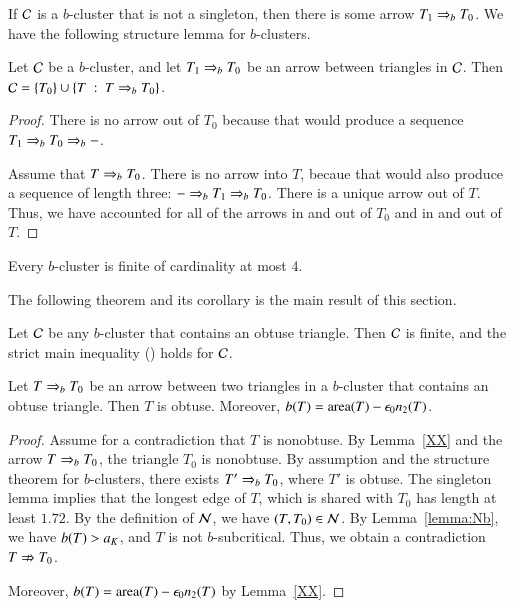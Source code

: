 If $\mathcal C$ is a $b$-cluster that is not a singleton, then there is
some arrow $T_1\Rightarrow_{b} T_0$.  We have the following structure
lemma for $b$-clusters.

\begin{lemma}
  Let $\mathcal C$ be a $b$-cluster, and let $T_1\Rightarrow_{b} T_0$ be an
  arrow between triangles in $\mathcal C$.
  Then $\mathcal C = \{T_0\}\cup \{T \ :\  T\Rightarrow_{b} T_0\}$.
\end{lemma}

\begin{proof}  There is no arrow out of $T_0$ because that
would produce a sequence $T_1\Rightarrow_{b} T_0\Rightarrow_{b} -$.  

Assume that $T\Rightarrow_{b} T_0$.  There is
no arrow into $T$,  becaue that would also produce a sequence
of length three: $- \Rightarrow_{b} T_1 \Rightarrow_{b} T_0$.  There is a unique arrow out of $T$.
Thus, we have accounted for all of the arrows in and out of $T_0$ and in and
out of $T$.
\end{proof}

\begin{corollary}
  Every $b$-cluster is finite of cardinality at most $4$.
\end{corollary}


The following theorem and its corollary is the main result of this
section.  

\begin{theorem}  
  Let $\mathcal C$ be any $b$-cluster that contains an obtuse triangle.  Then
  $\mathcal C$ is finite, and the strict main inequality
  () holds for $\mathcal C$.
\end{theorem}

\begin{lemma} Let $T\Rightarrow_{b} T_0$ be an arrow between two triangles in
a $b$-cluster that contains an obtuse triangle.  Then $T$ is obtuse.
Moreover, $b(T) = {\operatorname{area}}(T) -\epsilon_0 n_2(T)$.
\end{lemma}

\begin{proof} Assume for a contradiction that $T$ is nonobtuse.  By Lemma~\ref{XX}
and the arrow $T\Rightarrow_{b} T_0$, the triangle $T_0$ is nonobtuse.  By assumption and the structure
theorem for $b$-clusters, there exists
$T'\Rightarrow_{b} T_0$, where $T'$ is obtuse.
The singleton lemma implies that the longest edge of $T$, which is shared with $T_0$ has length
at least $1.72$.  By the definition of $\mathcal N$, we have $(T,T_0)\in\mathcal N$.   By Lemma~\ref{lemma:Nb}, we
have $b(T)>a_K$, and $T$ is not $b$-subcritical.  Thus, we obtain a contradiction $T\nRightarrow T_0$.

Moreover, $b(T) = {\operatorname{area}}(T) -\epsilon_0 n_2(T)$ by Lemma~\ref{XX}.
\end{proof}

